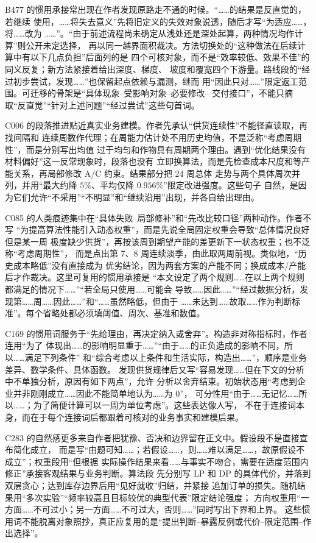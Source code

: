 \documentclass[UTF8,a4paper,12pt]{ctexart}
\begin{document}
B477 的惯用承接常出现在作者发现原路走不通的时候。“……的结果是反直觉的，若继续
使用，……将失去意义”先将旧定义的失效对象说透，随后才写“为适应……，将……改为
……”。“由于前述流程尚未确定从浅处还是深处起算，两种情况均作计算”则公开未定选择，
再以同一越界面积裁决。方法切换处的“这种做法在后续计算中有以下几点负担”后面列的是
四个可核对象，而不是“效率较低、效果不佳”的同义反复；新方法紧接着给出深度、梯度、
坡度和覆宽四个下游量。路线段的“经过初步尝试，发现……”也保留起点依赖与漏测，继而
用“因此只对……”限定返工范围。可迁移的骨架是“具体现象--受影响对象--必要修改--
交付接口”，不能只摘取“反直觉”“针对上述问题”“经过尝试”这些句首词。

C006 的段落推进贴近真实业务建模。作者先承认“供货连续性”不能径直读取，再找间隔和
连续周数作代理；在周能力估计处不用历史均值，不是泛称“考虑周期性”，而是分别写出均值
过于均匀和作物具有周期两个理由。遇到“优化结果没有材料偏好”这一反常现象时，段落也没有
立即换算法，而是先检查成本尺度和等产能关系，再局部修改 A/C 约束。结果部分把 24 周总体
走势与两个具体周次并列，并用“最大约降 $5\%$、平均仅降 $0.956\%$”限定改进强度。这些句子
自然，是因为它们允许“不采用”“不明显”和“继续沿用”出现，并各自给出理由。

C085 的人类痕迹集中在“具体失败--局部修补”和“先改比较口径”两种动作。作者不写
“为提高算法性能引入动态权重”，而是先说全局固定权重会导致“总体情况良好但是某一周
极度缺少供货”，再按该周到期望产能的差更新下一状态权重；也不泛称“考虑周期性”，
而是点出第 7、8 周连续淡季，由此取两周前视。类似地，“历史成本略低”没有直接成为
优劣结论，因为两套方案的产能不同；换成成本/产能后才作裁决。这里可复用的惯用承接是
“本文设定了两个规则……在以上两个规则都满足的情况下……”“若全局只使用……可能会
导致……因此……”“经过数据分析，发现第……周……因此……”和“……虽然略低，但由于
……未达到……故取……作为判断标准”。每个省略处都必须填阈值、周次、基准和数值。

C169 的惯用词服务于“先给理由，再决定纳入或舍弃”。构造非对称指标时，作者连用“为了
体现出……的影响明显重于……”“由于……的正负造成的影响不同，所以……满足下列条件”
和“综合考虑以上条件和生活实际，构造出……”，顺序是业务差异、数学条件、具体函数。
发现供货规律后又写“容易发现……但在下文的分析中不单独分析，原因有如下两点”，允许
分析以舍弃结束。初始状态用“考虑到企业并非刚刚成立……因此不能简单地认为……为 0”，
可分性用“由于……无记忆……所以……；为了简便计算可以一周为单位考虑”。这些表达像人写，
不在于连接词本身，而在于每个连接词后都跟着可核对的业务事实和建模后果。

C283 的自然感更多来自作者把犹豫、否决和边界留在正文中。假设段不是直接宣布简化成立，
而是写“由题可知……；若假设……，则……难以满足……，故原假设不成立”；权重段用“但根据
实际操作结果来看……与事实不吻合，需要在适度范围内修正”承接客观结果与业务判断。算法段
先分别写 LP 和 DP 的具体代价，并落到双层贪心；达到库存边界后用“见好就收”归结，并紧接
追加订单的损失。随机结果用“多次实验”“频率较高且目标较优的典型代表”限定结论强度；
方向权重用“一方面……不可过小；另一方面……不可过大，否则……”同时写出下界和上界。
这些惯用词不能脱离对象照抄，真正应复用的是“提出判断--暴露反例或代价--限定范围--作出选择”。
\end{document}
